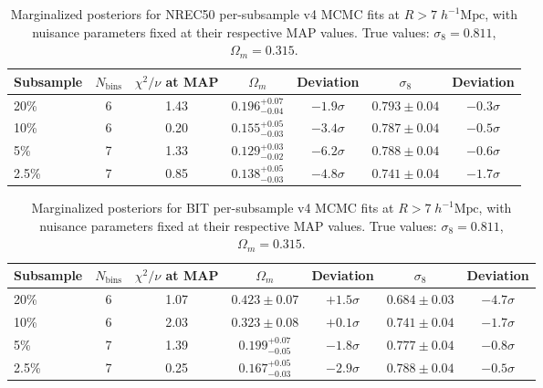 \documentclass[12pt]{report}
\begin{document}
\begin{table}[H]
    \centering
    \caption{Marginalized posteriors for NREC50 per-subsample v4 MCMC fits at $R > 7\;h^{-1}\mathrm{Mpc}$, with nuisance parameters fixed at their respective MAP values. True values: $\sigma_8 = 0.811$, $\Omega_m = 0.315$.}
    \label{tab:nrec50_subsample_results}
    \begin{tabular}{lcccccc}
        \toprule
        \textbf{Subsample} & \textbf{$N_{\mathrm{bins}}$} & \textbf{$\chi^2/\nu$ at MAP} & \textbf{$\Omega_m$} & \textbf{Deviation} & \textbf{$\sigma_8$} & \textbf{Deviation} \\
        \midrule
        20\%   & 6 & 1.43 & $0.196^{+0.07}_{-0.04}$ & $-1.9\sigma$ & $0.793 \pm 0.04$ & $-0.3\sigma$ \\
        10\%   & 6 & 0.20 & $0.155^{+0.05}_{-0.03}$ & $-3.4\sigma$ & $0.787 \pm 0.04$ & $-0.5\sigma$ \\
        5\%    & 7 & 1.33 & $0.129^{+0.03}_{-0.02}$ & $-6.2\sigma$ & $0.788 \pm 0.04$ & $-0.6\sigma$ \\
        2.5\%  & 7 & 0.85 & $0.138^{+0.05}_{-0.03}$ & $-4.8\sigma$ & $0.741 \pm 0.04$ & $-1.7\sigma$ \\
        \bottomrule
    \end{tabular}
\end{table}

\begin{table}[H]
    \centering
    \caption{Marginalized posteriors for BIT per-subsample v4 MCMC fits at $R > 7\;h^{-1}\mathrm{Mpc}$, with nuisance parameters fixed at their respective MAP values. True values: $\sigma_8 = 0.811$, $\Omega_m = 0.315$.}
    \label{tab:bit_subsample_results}
    \begin{tabular}{lcccccc}
        \toprule
        \textbf{Subsample} & \textbf{$N_{\mathrm{bins}}$} & \textbf{$\chi^2/\nu$ at MAP} & \textbf{$\Omega_m$} & \textbf{Deviation} & \textbf{$\sigma_8$} & \textbf{Deviation} \\
        \midrule
        20\%   & 6 & 1.07 & $0.423 \pm 0.07$       & $+1.5\sigma$ & $0.684 \pm 0.03$ & $-4.7\sigma$ \\
        10\%   & 6 & 2.03 & $0.323 \pm 0.08$       & $+0.1\sigma$ & $0.741 \pm 0.04$ & $-1.7\sigma$ \\
        5\%    & 7 & 1.39 & $0.199^{+0.07}_{-0.05}$ & $-1.8\sigma$ & $0.777 \pm 0.04$ & $-0.8\sigma$ \\
        2.5\%  & 7 & 0.25 & $0.167^{+0.05}_{-0.03}$ & $-2.9\sigma$ & $0.788 \pm 0.04$ & $-0.5\sigma$ \\
        \bottomrule
    \end{tabular}
\end{table}
\end{document}
